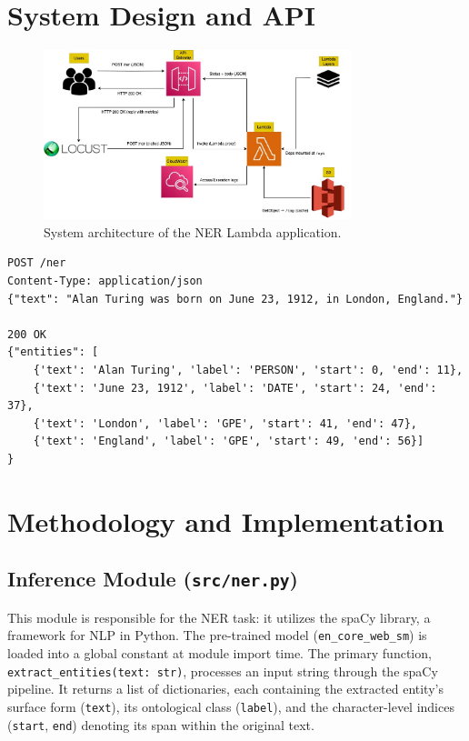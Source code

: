 \documentclass[11pt,a4paper]{article}
\begin{document}
\section{System Design and API}

\begin{figure}[H]
    \centering
    \includegraphics[width=0.8\textwidth]{figures/architecture_diagram.jpeg}
    \caption{System architecture of the NER Lambda application.}
    \label{fig:architecture}
\end{figure}

\begin{verbatim}
POST /ner
Content-Type: application/json
{"text": "Alan Turing was born on June 23, 1912, in London, England."}

200 OK
{"entities": [
    {'text': 'Alan Turing', 'label': 'PERSON', 'start': 0, 'end': 11},
    {'text': 'June 23, 1912', 'label': 'DATE', 'start': 24, 'end': 37},
    {'text': 'London', 'label': 'GPE', 'start': 41, 'end': 47},
    {'text': 'England', 'label': 'GPE', 'start': 49, 'end': 56}]
}
\end{verbatim}


\section{Methodology and Implementation}

\subsection{Inference Module (\texttt{src/ner.py})}
This module is responsible for the NER task: it utilizes the spaCy library, a framework for NLP in Python. The pre-trained model (\texttt{en\_core\_web\_sm}) is loaded into a global constant at module import time. The primary function, \texttt{extract\_entities(text: str)}, processes an input string through the spaCy pipeline. It returns a list of dictionaries, each containing the extracted entity's surface form (\texttt{text}), its ontological class (\texttt{label}), and the character-level indices (\texttt{start}, \texttt{end}) denoting its span within the original text.
\end{document}

